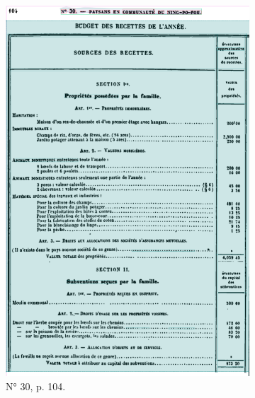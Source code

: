 \begin{figure}[t]
    \centering
    \begin{subfigure}{0.3\textwidth}
     \includegraphics[width=1\linewidth]{img/transkribus_30.png}
     \caption{N° 30, p. 104.}
     \label{fig:odm30tkb}
    \end{subfigure}
    \hspace{5pt}
    \begin{subfigure}{0.3\textwidth}

\end{subfigure}
\end{figure}
